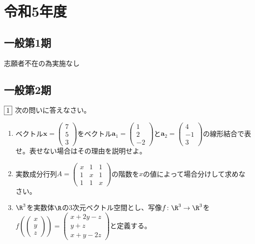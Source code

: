 \documentclass[dvipdfmx]{jsreport}
\begin{document}
\chapter{令和5年度}
\section{一般第1期}
	志願者不在の為実施なし

\section{一般第2期}
\begin{tcolorbox} %
	$\fbox{1}$ 次の問いに答えなさい。
\begin{enumerate}
	\item ベクトル$\bm{x}= \begin{pmatrix}7\\ 5\\ 3\end{pmatrix}$をベクトル$\bm{a}_1= \begin{pmatrix}1\\ 2\\ -2\end{pmatrix}$と$\bm{a}_2= \begin{pmatrix}4\\ -1\\ 3\end{pmatrix}$の線形結合で表せ。表せない場合はその理由を説明せよ。
	\item 実数成分行列$A= \begin{pmatrix}x& 1& 1\\ 1& x& 1\\ 1& 1& x\end{pmatrix}$の階数を$x$の値によって場合分けして求めなさい。
	\item $\R^3$を実数体$\R$の3次元ベクトル空間とし、写像$f\colon \R^3\to \R^3$を$f\left(\begin{pmatrix}x\\ y\\ z\end{pmatrix}\right)= \begin{pmatrix}{x+ 2y- z}\\ {y+ z}\\ {x+ y- 2z}\end{pmatrix}$と定義する。
\end{enumerate}
\end{tcolorbox}
\end{document}
